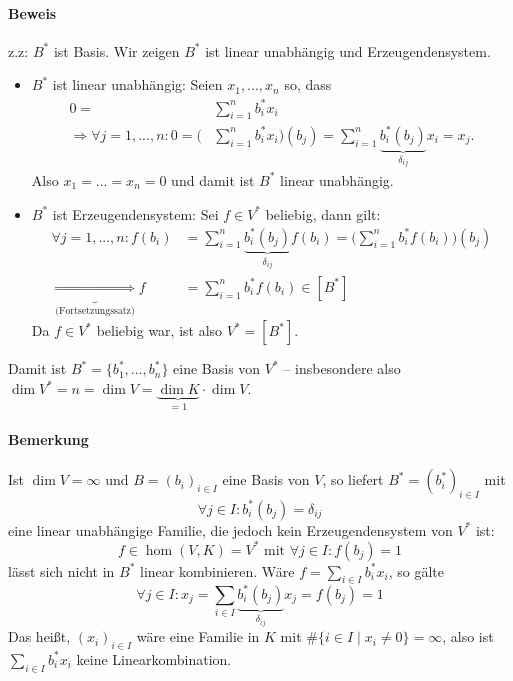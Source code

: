  	\paragraph{Beweis} z.z: $B^*$ ist Basis. Wir zeigen $B^*$ ist linear unabhängig und Erzeugendensystem.
 		\begin{itemize}
 			\item $ B^* $ ist linear unabhängig: Seien $ x_1,...,x_n $ so, dass
 			      \begin{align*}
 			      	0 =                                      & \sum_{i=1}^{n}b_i^*x_i                                                                           \\
 			      	\Rightarrow \forall j=1,...,n: 0 = \Big( & \sum_{i=1}^{n}b_i^*x_i\Big)(b_j) = \sum_{i=1}^{n}\underbrace{b_i^*(b_j)}_{\delta_{ij}}x_i = x_j.
 			      \end{align*}
 			      Also $ x_1 = ... = x_n = 0 $ und damit ist $ B^* $ linear unabhängig.
 			\item $ B^* $ ist Erzeugendensystem: Sei $ f\in V^* $ beliebig, dann gilt:
 			      \begin{align*}
 			      	\forall j = 1,...,n:f(b_i)                             & = \sum_{i=1}^{n}\underbrace{b_i^*(b_j)}_{\delta_{ij}}f(b_i) = \Big(\sum_{i=1}^{n}b_i^*f(b_i)\Big)(b_j) \\
 			      	\underbrace{\Rightarrow}_{\text{(Fortsetzungssatz)}} f & = \sum_{i=1}^{n}b_i^*f(b_i)\in [B^*]
 			      \end{align*}
 			      Da $ f\in V^* $ beliebig war, ist also $ V^* = [B^*]$.
 		\end{itemize}
 		Damit ist $ B^* = \{b_1^*,...,b_n^*\}$ eine Basis von $ V^* $ -- insbesondere also $ \dim V^* = n = \dim V = \underbrace{\dim K}_{=1}\cdot \dim V $.

 	\paragraph{Bemerkung}
 		Ist $\dim V = \infty$ und $B=(b_i)_{i\in I}$ eine Basis von $V$, so liefert $B^\ast=(b_i^\ast)_{i\in I}$ mit
 		\[
 			\forall j\in I:b_i^\ast(b_j)=\delta_{ij}
 		\]
 		eine linear unabhängige Familie, die jedoch kein Erzeugendensystem von $V^\ast$ ist:
 		\[
 			f\in\hom(V,K)=V^\ast \text{ mit } \forall j\in I:f(b_j)=1
 		\]
 		lässt sich nicht in $B^\ast$ linear kombinieren. Wäre $f=\sum_{i\in I}b_i^\ast x_i$, so gälte
 		\[
 			\forall j\in I: x_j =\sum_{i\in I}\underbrace{b_i^\ast(b_j)}_{\delta_{ij}}x_j = f(b_j) = 1
 		\]
 		Das heißt, $(x_i)_{i\in I}$ wäre eine Familie in $ K $ mit $\#\{i\in I\mid x_i\neq 0\}=\infty$, also ist $\sum_{i\in I}b_i^\ast x_i$ keine Linearkombination.

